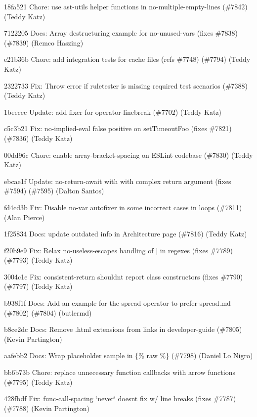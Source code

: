 \begin{DoxyItemize}
\item 18fa521 Chore\+: use ast-\/utils helper functions in no-\/multiple-\/empty-\/lines (\#7842) (Teddy Katz)
\item 7122205 Docs\+: Array destructuring example for no-\/unused-\/vars (fixes \#7838) (\#7839) (Remco Haszing)
\item e21b36b Chore\+: add integration tests for cache files (refs \#7748) (\#7794) (Teddy Katz)
\item 2322733 Fix\+: Throw error if ruletester is missing required test scenarios (\#7388) (Teddy Katz)
\item 1beecec Update\+: add fixer for {\ttfamily operator-\/linebreak} (\#7702) (Teddy Katz)
\item c5c3b21 Fix\+: no-\/implied-\/eval false positive on \textquotesingle{}set\+Timeout\+Foo\textquotesingle{} (fixes \#7821) (\#7836) (Teddy Katz)
\item 00dd96c Chore\+: enable array-\/bracket-\/spacing on E\+S\+Lint codebase (\#7830) (Teddy Katz)
\item ebcae1f Update\+: no-\/return-\/await with with complex {\ttfamily return} argument (fixes \#7594) (\#7595) (Dalton Santos)
\item fd4cd3b Fix\+: Disable no-\/var autofixer in some incorrect cases in loops (\#7811) (Alan Pierce)
\item 1f25834 Docs\+: update outdated info in Architecture page (\#7816) (Teddy Katz)
\item f20b9e9 Fix\+: Relax no-\/useless-\/escape\textquotesingle{}s handling of \textquotesingle{}\mbox{]}\textquotesingle{} in regexes (fixes \#7789) (\#7793) (Teddy Katz)
\item 3004c1e Fix\+: consistent-\/return shouldn\textquotesingle{}t report class constructors (fixes \#7790) (\#7797) (Teddy Katz)
\item b938f1f Docs\+: Add an example for the spread operator to prefer-\/spread.\+md (\#7802) (\#7804) (butlermd)
\item b8ce2dc Docs\+: Remove .html extensions from links in developer-\/guide (\#7805) (Kevin Partington)
\item aafebb2 Docs\+: Wrap placeholder sample in \{\% raw \%\} (\#7798) (Daniel Lo Nigro)
\item bb6b73b Chore\+: replace unnecessary function callbacks with arrow functions (\#7795) (Teddy Katz)
\item 428fbdf Fix\+: func-\/call-\/spacing \char`\"{}never\char`\"{} doesn\textquotesingle{}t fix w/ line breaks (fixes \#7787) (\#7788) (Kevin Partington)

\end{DoxyItemize}
